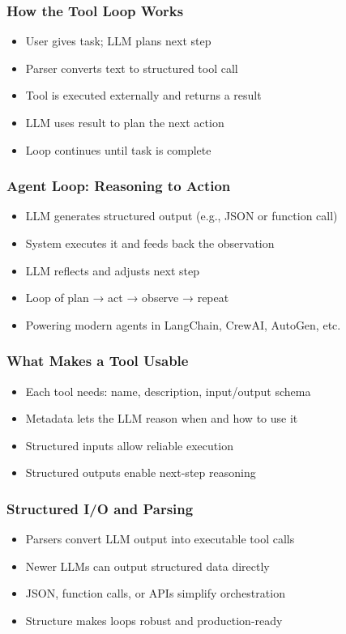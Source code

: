 \begin{frame}[fragile]\frametitle{How the Tool Loop Works}
      \begin{itemize}
        \item User gives task; LLM plans next step
        \item Parser converts text to structured tool call
        \item Tool is executed externally and returns a result
        \item LLM uses result to plan the next action
        \item Loop continues until task is complete
      \end{itemize}
\end{frame}

\begin{frame}[fragile]\frametitle{Agent Loop: Reasoning to Action}
      \begin{itemize}
        \item LLM generates structured output (e.g., JSON or function call)
        \item System executes it and feeds back the observation
        \item LLM reflects and adjusts next step
        \item Loop of plan → act → observe → repeat
        \item Powering modern agents in LangChain, CrewAI, AutoGen, etc.
      \end{itemize}
\end{frame}

\begin{frame}[fragile]\frametitle{What Makes a Tool Usable}
      \begin{itemize}
        \item Each tool needs: name, description, input/output schema
        \item Metadata lets the LLM reason when and how to use it
        \item Structured inputs allow reliable execution
        \item Structured outputs enable next-step reasoning
      \end{itemize}
\end{frame}

\begin{frame}[fragile]\frametitle{Structured I/O and Parsing}
      \begin{itemize}
        \item Parsers convert LLM output into executable tool calls
        \item Newer LLMs can output structured data directly
        \item JSON, function calls, or APIs simplify orchestration
        \item Structure makes loops robust and production-ready
      \end{itemize}
\end{frame}

